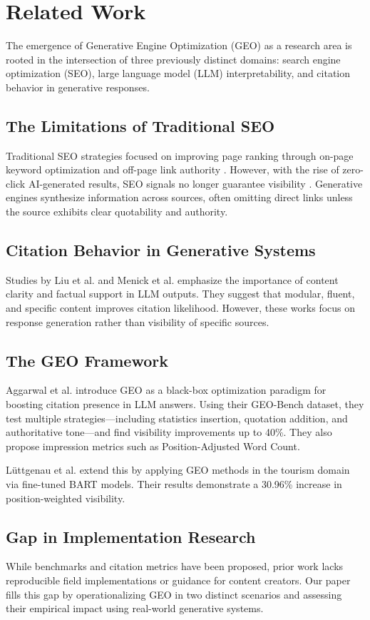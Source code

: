 \section{Related Work}

The emergence of Generative Engine Optimization (GEO) as a research area is rooted in the intersection of three previously distinct domains: search engine optimization (SEO), large language model (LLM) interpretability, and citation behavior in generative responses.

\subsection{The Limitations of Traditional SEO}

Traditional SEO strategies focused on improving page ranking through on-page keyword optimization and off-page link authority \cite{ziakis2024ai}. However, with the rise of zero-click AI-generated results, SEO signals no longer guarantee visibility \cite{lodolce2024gartner}. Generative engines synthesize information across sources, often omitting direct links unless the source exhibits clear quotability and authority.

\subsection{Citation Behavior in Generative Systems}

Studies by Liu et al. \cite{liu2023verifiability} and Menick et al. \cite{menick2022quotes} emphasize the importance of content clarity and factual support in LLM outputs. They suggest that modular, fluent, and specific content improves citation likelihood. However, these works focus on response generation rather than visibility of specific sources.

\subsection{The GEO Framework}

Aggarwal et al. \cite{aggarwal2024geo} introduce GEO as a black-box optimization paradigm for boosting citation presence in LLM answers. Using their GEO-Bench dataset, they test multiple strategies---including statistics insertion, quotation addition, and authoritative tone---and find visibility improvements up to 40\%. They also propose impression metrics such as Position-Adjusted Word Count.

L\"uttgenau et al. \cite{luttgenau2025beyondseo} extend this by applying GEO methods in the tourism domain via fine-tuned BART models. Their results demonstrate a 30.96\% increase in position-weighted visibility.

\subsection{Gap in Implementation Research}

While benchmarks and citation metrics have been proposed, prior work lacks reproducible field implementations or guidance for content creators. Our paper fills this gap by operationalizing GEO in two distinct scenarios and assessing their empirical impact using real-world generative systems.
